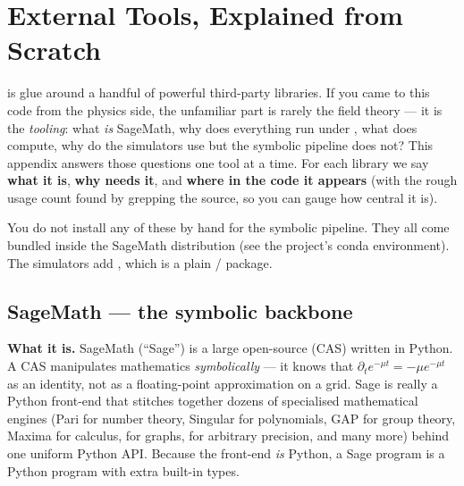 \chapter{External Tools, Explained from Scratch}
\label{app:tools}

\Daedalus{} is glue around a handful of powerful third-party libraries.  If you
came to this code from the physics side, the unfamiliar part is rarely the
field theory --- it is the \emph{tooling}: what \emph{is} SageMath, why does
everything run under , what does  compute, why do
the simulators use  but the symbolic pipeline does not?  This
appendix answers those questions one tool at a time.  For each library we say
\textbf{what it is}, \textbf{why \Daedalus{} needs it}, and \textbf{where in the
code it appears} (with the rough usage count found by grepping the source, so
you can gauge how central it is).

\begin{note}
You do not install any of these by hand for the symbolic pipeline.  They all
come bundled inside the SageMath distribution (see the project's
 conda environment).  The simulators add ,
which is a plain / package.
\end{note}

\section{SageMath --- the symbolic backbone}

\textbf{What it is.}  SageMath (``Sage'') is a large open-source
 (CAS) written in Python.  A CAS manipulates
mathematics \emph{symbolically} --- it knows that $\partial_t e^{-\mu t}=-\mu
e^{-\mu t}$ as an identity, not as a floating-point approximation on a grid.
Sage is really a Python front-end that stitches together dozens of specialised
mathematical engines (Pari for number theory, Singular for polynomials, GAP for
group theory, Maxima for calculus,  for graphs,  for
arbitrary precision, and many more) behind one uniform Python API.  Because the
front-end \emph{is} Python, a Sage program is a Python program with extra
built-in types.

